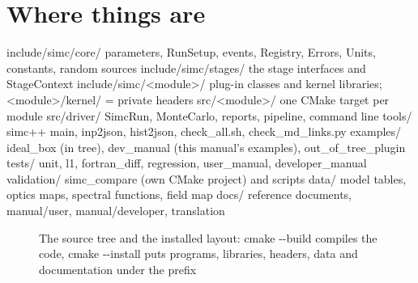 \section{\texorpdfstring{Where things are}{Where things are}}\label{developer_manual-01u5foverview:14-where-things-are}
\begin{simcplain}[basicstyle=\ttfamily\scriptsize]
include/simc/core/        parameters, RunSetup, events, Registry, Errors, Units, constants, random sources
include/simc/stages/      the stage interfaces and StageContext
include/simc/<module>/    plug-in classes and kernel libraries; <module>/kernel/ = private headers
src/<module>/             one CMake target per module
src/driver/               SimcRun, MonteCarlo, reports, pipeline, command line
tools/                    simc++ main, inp2json, hist2json, check_all.sh, check_md_links.py
examples/                 ideal_box (in tree), dev_manual (this manual's examples), out_of_tree_plugin
tests/                    unit, l1, fortran_diff, regression, user_manual, developer_manual
validation/               simc_compare (own CMake project) and scripts
data/                     model tables, optics maps, spectral functions, field map
docs/                     reference documents, manual/user, manual/developer, translation
\end{simcplain}
\begin{figure}[htbp]
\caption[The source tree and the installed layout]{The source tree and the installed layout: cmake -{}-build compiles the code, cmake -{}-install puts programs, libraries, headers, data and documentation under the prefix}\label{fig:sourceu5flayout}
\end{figure}
